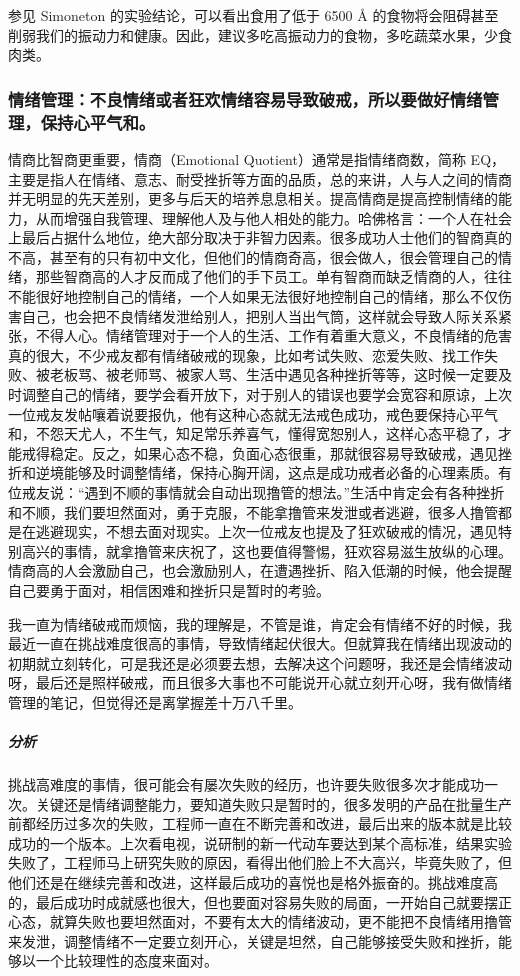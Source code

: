 参见 Simoneton 的实验结论，可以看出食用了低于 6500 \unit{\angstrom} 的食物将会阻碍甚至削弱我们的振动力和健康。因此，建议多吃高振动力的食物，多吃蔬菜水果，少食肉类。

\subsubsection{情绪管理：不良情绪或者狂欢情绪容易导致破戒，所以要做好情绪管理，保持心平气和。}

情商比智商更重要，情商（Emotional Quotient）通常是指情绪商数，简称 EQ，主要是指人在情绪、意志、耐受挫折等方面的品质，总的来讲，人与人之间的情商并无明显的先天差别，更多与后天的培养息息相关。提高情商是提高控制情绪的能力，从而增强自我管理、理解他人及与他人相处的能力。哈佛格言：一个人在社会上最后占据什么地位，绝大部分取决于非智力因素。很多成功人士他们的智商真的不高，甚至有的只有初中文化，但他们的情商奇高，很会做人，很会管理自己的情绪，那些智商高的人才反而成了他们的手下员工。单有智商而缺乏情商的人，往往不能很好地控制自己的情绪，一个人如果无法很好地控制自己的情绪，那么不仅伤害自己，也会把不良情绪发泄给别人，把别人当出气筒，这样就会导致人际关系紧张，不得人心。情绪管理对于一个人的生活、工作有着重大意义，不良情绪的危害真的很大，不少戒友都有情绪破戒的现象，比如考试失败、恋爱失败、找工作失败、被老板骂、被老师骂、被家人骂、生活中遇见各种挫折等等，这时候一定要及时调整自己的情绪，要学会看开放下，对于别人的错误也要学会宽容和原谅，上次一位戒友发帖嚷着说要报仇，他有这种心态就无法戒色成功，戒色要保持心平气和，不怨天尤人，不生气，知足常乐养喜气，懂得宽恕别人，这样心态平稳了，才能戒得稳定。反之，如果心态不稳，负面心态很重，那就很容易导致破戒，遇见挫折和逆境能够及时调整情绪，保持心胸开阔，这点是成功戒者必备的心理素质。有位戒友说：“遇到不顺的事情就会自动出现撸管的想法。”生活中肯定会有各种挫折和不顺，我们要坦然面对，勇于克服，不能拿撸管来发泄或者逃避，很多人撸管都是在逃避现实，不想去面对现实。上次一位戒友也提及了狂欢破戒的情况，遇见特别高兴的事情，就拿撸管来庆祝了，这也要值得警惕，狂欢容易滋生放纵的心理。情商高的人会激励自己，也会激励别人，在遭遇挫折、陷入低潮的时候，他会提醒自己要勇于面对，相信困难和挫折只是暂时的考验。

\begin{case}[情绪管理]
    我一直为情绪破戒而烦恼，我的理解是，不管是谁，肯定会有情绪不好的时候，我最近一直在挑战难度很高的事情，导致情绪起伏很大。但就算我在情绪出现波动的初期就立刻转化，可是我还是必须要去想，去解决这个问题呀，我还是会情绪波动呀，最后还是照样破戒，而且很多大事也不可能说开心就立刻开心呀，我有做情绪管理的笔记，但觉得还是离掌握差十万八千里。
    \subparagraph{分析} 挑战高难度的事情，很可能会有屡次失败的经历，也许要失败很多次才能成功一次。关键还是情绪调整能力，要知道失败只是暂时的，很多发明的产品在批量生产前都经历过多次的失败，工程师一直在不断完善和改进，最后出来的版本就是比较成功的一个版本。上次看电视，说研制的新一代动车要达到某个高标准，结果实验失败了，工程师马上研究失败的原因，看得出他们脸上不大高兴，毕竟失败了，但他们还是在继续完善和改进，这样最后成功的喜悦也是格外振奋的。挑战难度高的，最后成功时成就感也很大，但也要面对容易失败的局面，一开始自己就要摆正心态，就算失败也要坦然面对，不要有太大的情绪波动，更不能把不良情绪用撸管来发泄，调整情绪不一定要立刻开心，关键是坦然，自己能够接受失败和挫折，能够以一个比较理性的态度来面对。
\end{case}

